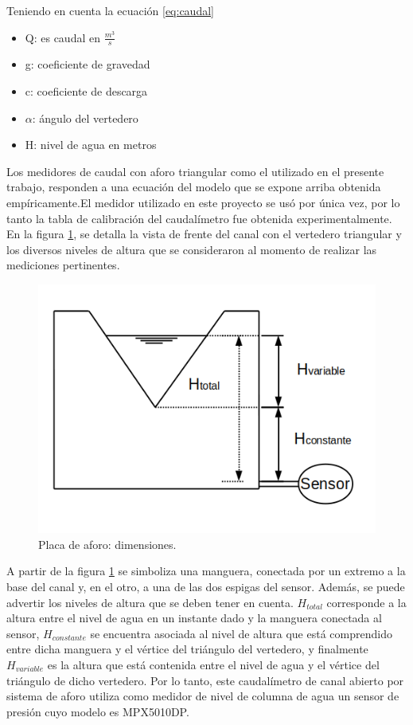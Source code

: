 Teniendo en cuenta la ecuación \ref{eq:caudal}

\begin{itemize}
\item Q: es caudal en $\frac{m^3}{s} $
\item g: coeficiente de gravedad
\item c: coeficiente de descarga
\item $\alpha$: ángulo del vertedero
\item H: nivel de agua en metros
\end{itemize}

Los medidores de caudal con aforo triangular como el utilizado en el presente trabajo, responden a una ecuación del modelo que se expone arriba obtenida empíricamente.El medidor utilizado en este proyecto se usó por única vez, por lo tanto la tabla de calibración del caudalímetro fue obtenida experimentalmente.  
En la figura \ref{fig:alturas vertedero}, se detalla la vista de frente del canal con el vertedero triangular y los diversos niveles de altura que se consideraron al momento de realizar las mediciones pertinentes. 

\begin{figure}[htpb]
\centering
\includegraphics[scale=.75]{./Figures/EsquemaMedicionPresion.png}
\caption{Placa de aforo: dimensiones.}
\label{fig:alturas vertedero}
\end{figure}

A partir de la figura \ref{fig:alturas vertedero} se simboliza una manguera, conectada por un extremo a la base del canal y, en el otro, a una de las dos espigas del sensor. Además, se puede advertir los niveles de altura que se deben tener en cuenta. $H_{total}$ corresponde a la altura entre el nivel de agua en un instante dado y la manguera conectada al sensor, $H_{constante}$ se encuentra asociada al nivel de altura que está comprendido entre dicha manguera y el vértice del triángulo del vertedero, y finalmente $H_{variable}$ es la altura que está contenida entre el nivel de agua y el vértice del triángulo de dicho vertedero.    
Por lo tanto, este caudalímetro de canal abierto por sistema de aforo utiliza como medidor de nivel de columna de agua un sensor de presión cuyo modelo es MPX5010DP. 

